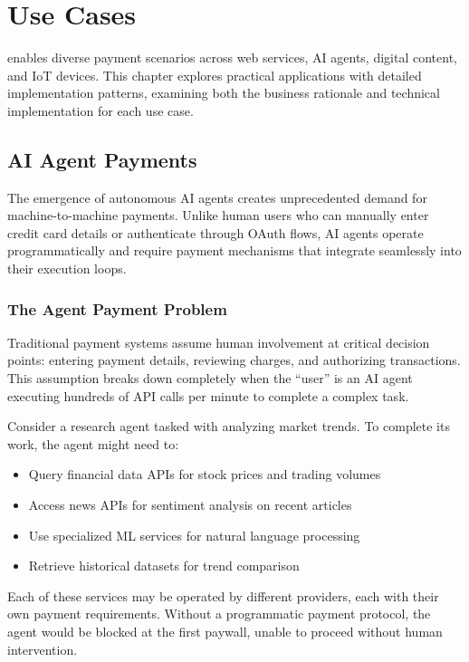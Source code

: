 \chapter{Use Cases}
\label{ch:use-cases}

\tprotocol{} enables diverse payment scenarios across web services, AI agents, digital content, and IoT devices. This chapter explores practical applications with detailed implementation patterns, examining both the business rationale and technical implementation for each use case.

\section{AI Agent Payments}
\label{sec:ai-payments}

The emergence of autonomous AI agents creates unprecedented demand for machine-to-machine payments. Unlike human users who can manually enter credit card details or authenticate through OAuth flows, AI agents operate programmatically and require payment mechanisms that integrate seamlessly into their execution loops.

\subsection{The Agent Payment Problem}

Traditional payment systems assume human involvement at critical decision points: entering payment details, reviewing charges, and authorizing transactions. This assumption breaks down completely when the ``user'' is an AI agent executing hundreds of API calls per minute to complete a complex task.

Consider a research agent tasked with analyzing market trends. To complete its work, the agent might need to:
\begin{itemize}
    \item Query financial data APIs for stock prices and trading volumes
    \item Access news APIs for sentiment analysis on recent articles
    \item Use specialized ML services for natural language processing
    \item Retrieve historical datasets for trend comparison
\end{itemize}

Each of these services may be operated by different providers, each with their own payment requirements. Without a programmatic payment protocol, the agent would be blocked at the first paywall, unable to proceed without human intervention.

